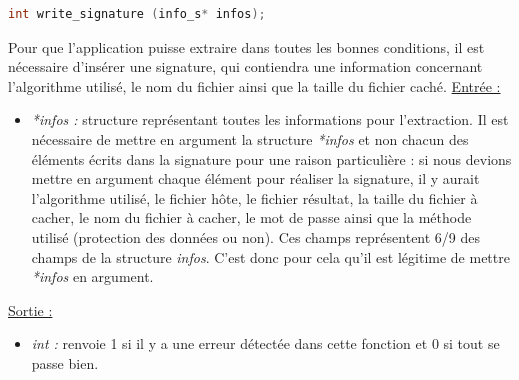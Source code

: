 \documentclass[11pt]{article}
\begin{document}
\begin{lstlisting}[language=c]
int write_signature (info_s* infos); 
\end{lstlisting}

Pour que l'application puisse extraire dans toutes les bonnes conditions, 
il est nécessaire d'insérer une signature, qui contiendra une information
concernant l'algorithme utilisé, le nom du fichier ainsi que la taille du 
fichier caché. 
\newline
\underline{Entrée :} 
\begin{itemize}
\item \textit{*infos :} structure représentant toutes les informations pour 
l'extraction. Il est nécessaire de mettre en argument la structure 
\textit{*infos} et non chacun des éléments écrits dans la signature pour 
une raison particulière : si nous devions mettre en argument chaque élément 
pour réaliser la signature, il y aurait l'algorithme utilisé, le fichier hôte, 
le fichier résultat, la taille du fichier à cacher, le nom du fichier à cacher, 
le mot de passe ainsi que la méthode utilisé (protection des données ou non). 
Ces champs représentent 6/9 des champs de la structure \textit{infos}. 
C'est donc pour cela qu'il est légitime de mettre \textit{*infos} en argument.  
\end{itemize}
\underline{Sortie :} 
\begin{itemize}
\item \textit{int :} renvoie 1 si il y a une erreur détectée dans cette 
fonction et 0 si tout se passe bien.  
\newline 
\end{itemize}


\end{document}

